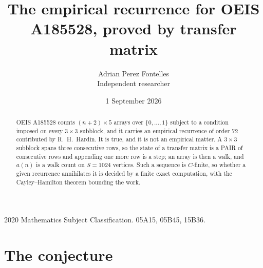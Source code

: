 \documentclass[11pt,a4paper]{article}
\title{The empirical recurrence for OEIS A185528, proved by transfer matrix}
\author{Adrian Perez Fontelles\\ \small Independent researcher}
\date{1 September 2026}
\theoremstyle{plain}
\theoremstyle{definition}
\begin{document}
\maketitle

\begin{abstract}
OEIS A185528 counts $(n+2)\times5$ arrays over $\{0,\dots,1\}$ subject to a condition imposed on
every $3\times3$ subblock, and it carries an empirical recurrence of order $72$
contributed by R.~H.~Hardin. It is true, and it is not an empirical matter. A $3\times3$
subblock spans three consecutive rows, so the state of a transfer matrix is a PAIR of
consecutive rows and appending one more row is a step; an array is then a walk, and
$a(n)$ is a walk count on $S=1024$ vertices. Such a sequence is $C$-finite, so whether a given
recurrence annihilates it is decided by a finite exact computation, with the Cayley--Hamilton
theorem bounding the work.
\end{abstract}

\noindent\small 2020 Mathematics Subject Classification. 05A15, 05B45, 15B36.\normalsize

\section{The conjecture}
\end{document}
